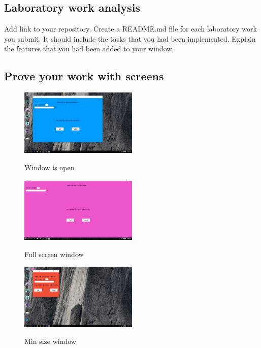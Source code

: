\subsection{Laboratory work analysis}

Add link to your repository.
Create a README.md file for each laboratory work you submit. It should include the tasks that you had been implemented.
Explain the features that you had been added to your window.

\subsection{Prove your work with screens}

\begin{figure}[h!]
  \centering
    {%
      \includegraphics[width=0.5\textwidth]{screen1}}
  \caption{Window is open}
\end{figure}

\begin{figure}[h!]
  \centering
    {%
      \includegraphics[width=0.5\textwidth]{screen2}}
  \caption{Full screen window}
\end{figure}

\begin{figure}[h!]
  \centering
    {%
      \includegraphics[width=0.5\textwidth]{screen3}}
  \caption{Min size window}
\end{figure}

